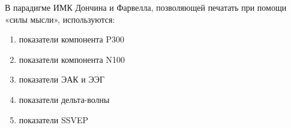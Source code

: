 
В парадигме ИМК Дончина и Фарвелла, позволяющей печатать при помощи «силы мысли», используются:

\begin{enumerate}
    \item показатели компонента P300
    \item показатели компонента N100
    \item показатели ЭАК и ЭЭГ
    \item показатели дельта-волны
    \item показатели SSVEP
\end{enumerate}